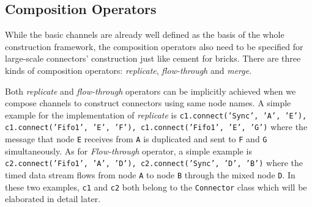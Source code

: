 \documentclass[preprint,3p]{elsarticle}
\begin{document}
\subsection{Composition Operators}\label{sec:compoperatorZ3}
While the basic channels are already well defined as the basis of the whole construction framework, the composition operators also need to be specified for large-scale connectors' construction just like cement for bricks. There are three kinds of composition operators: \emph{replicate}, \emph{flow-through} and \emph{merge}.

Both \emph{replicate} and \emph{flow-through} operators can be implicitly achieved when we compose channels to construct connectors using same node names. A simple example for the implementation of \emph{replicate} is \texttt{c1.connect('Sync', 'A', 'E'), c1.connect('Fifo1', 'E', 'F'), c1.connect('Fifo1', 'E', 'G')} where the message that node \texttt{E} receives from \texttt{A} is duplicated and sent to \texttt{F} and \texttt{G} simultaneously. As for \emph{Flow-through} operator, a simple example is \texttt{c2.connect('Fifo1', 'A', 'D'), c2.connect('Sync', 'D', 'B')} where the timed data stream flows from node \texttt{A} to node \texttt{B} through the mixed node \texttt{D}. In these two examples, \texttt{c1} and \texttt{c2} both belong to the \texttt{Connector} class which will be elaborated in detail later.
\end{document}
